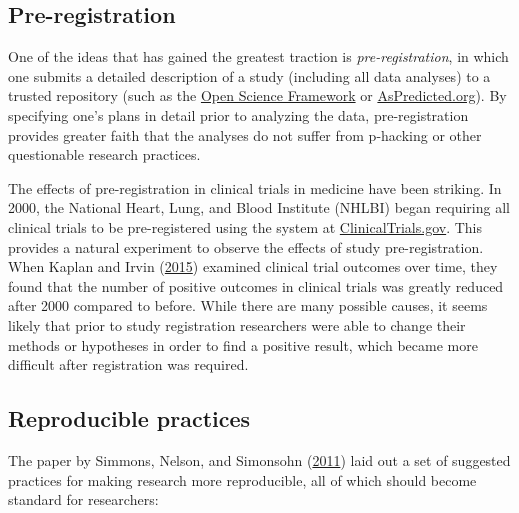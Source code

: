 \documentclass[
  12pt,
]{book}
\begin{document}
\hypertarget{pre-registration}{%
\subsection{Pre-registration}\label{pre-registration}}

One of the ideas that has gained the greatest traction is \emph{pre-registration}, in which one submits a detailed description of a study (including all data analyses) to a trusted repository (such as the \href{http://osf.io}{Open Science Framework} or \href{http://aspredicted.org}{AsPredicted.org}). By specifying one's plans in detail prior to analyzing the data, pre-registration provides greater faith that the analyses do not suffer from p-hacking or other questionable research practices.

The effects of pre-registration in clinical trials in medicine have been striking. In 2000, the National Heart, Lung, and Blood Institute (NHLBI) began requiring all clinical trials to be pre-registered using the system at \href{http://clinicaltrials.gov}{ClinicalTrials.gov}. This provides a natural experiment to observe the effects of study pre-registration. When Kaplan and Irvin (\protect\hyperlink{ref-kapl:irvi:2015}{2015}) examined clinical trial outcomes over time, they found that the number of positive outcomes in clinical trials was greatly reduced after 2000 compared to before. While there are many possible causes, it seems likely that prior to study registration researchers were able to change their methods or hypotheses in order to find a positive result, which became more difficult after registration was required.

\hypertarget{reproducible-practices}{%
\subsection{Reproducible practices}\label{reproducible-practices}}

The paper by Simmons, Nelson, and Simonsohn (\protect\hyperlink{ref-simm:nels:simo:2011}{2011}) laid out a set of suggested practices for making research more reproducible, all of which should become standard for researchers:
\end{document}
